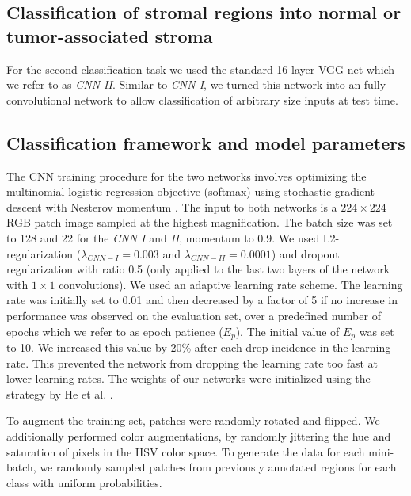 \documentclass{article}
\begin{document}
\subsection{Classification of stromal regions into normal or tumor-associated stroma}
For the second classification task we used the standard 16-layer VGG-net \cite{simonyan2014} which we refer to as \textit{CNN II}. Similar to \textit{CNN I}, we turned this network into an fully convolutional network to allow classification of arbitrary size inputs at test time.

\vspace*{-10 pt}
\subsection{Classification framework and model parameters}

The CNN training procedure for the two networks involves optimizing the multinomial logistic regression objective (softmax) using stochastic gradient descent with Nesterov momentum \cite{Nesterov1983}. The input to both networks is a $224 \times 224$ RGB patch image sampled at the highest magnification. The batch size was set to 128 and 22 for the \textit{CNN I} and \textit{II}, momentum to 0.9. We used L2-regularization ($\lambda _{CNN - I} = 0.003$ and $\lambda _{CNN - II} = 0.0001$) and dropout regularization with ratio 0.5 \cite{srivastava2014} (only applied to the last two layers of the network with $1 \times 1$ convolutions). We used an adaptive learning rate scheme. The learning rate was initially set to 0.01 and then decreased by a factor of 5 if no increase in performance was observed on the evaluation set, over a predefined number of epochs which we refer to as epoch patience ($E_p$). The initial value of $E_p$ was set to 10. We increased this value by 20\% after each drop incidence in the learning rate. This prevented the network from dropping the learning rate too fast at lower learning rates. The weights of our networks were initialized using the strategy by He et al. \cite{he2015}. 

To augment the training set, patches were randomly rotated and flipped. We additionally performed color augmentations, by randomly jittering the hue and saturation of pixels in the HSV color space. To generate the data for each mini-batch, we randomly sampled patches from previously annotated regions for each class with uniform probabilities.
\end{document}

